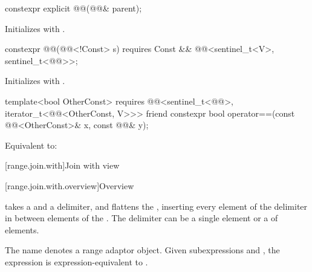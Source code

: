 %
\begin{itemdecl}
constexpr explicit @@(@@& parent);
\end{itemdecl}

\begin{itemdescr}
\pnum
\effects
Initializes  with .
\end{itemdescr}

%
\begin{itemdecl}
constexpr @@(@@<!Const> s)
  requires Const && @@<sentinel_t<V>, sentinel_t<@@>>;
\end{itemdecl}

\begin{itemdescr}
\pnum
\effects
Initializes  with .
\end{itemdescr}


\begin{itemdecl}
template<bool OtherConst>
  requires @@<sentinel_t<@@>, iterator_t<@@<OtherConst, V>>>
friend constexpr bool operator==(const @@<OtherConst>& x, const @@& y);
\end{itemdecl}

\begin{itemdescr}
\pnum
\effects
Equivalent to: 
\end{itemdescr}

[range.join.with]{Join with view}

[range.join.with.overview]{Overview}

\pnum
{} takes a  and a delimiter, and
flattens the ,
inserting every element of the delimiter
in between elements of the .
The delimiter can be a single element or a  of elements.

\pnum
{}%
The name  denotes
a range adaptor object.
Given subexpressions  and ,
the expression  is expression-equivalent to
.

